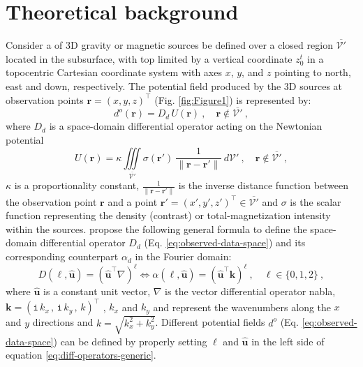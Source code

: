 \section{Theoretical background}

Consider a of 3D gravity or magnetic sources be defined over a closed region 
$\overline{\mathcal{V}'}$ located in the subsurface, with top limited by a vertical 
coordinate $z^{t}_{0}$ in a topocentric Cartesian coordinate system with axes 
$x$, $y$, and $z$ pointing to north, east and down, respectively.
The potential field produced by the 3D sources at observation points 
$\mathbf{r} = (x, y, z)^{\top}$ (Fig.  \ref{fig:Figure1}) is represented by:
\begin{equation}
	d^{o}(\mathbf{r}) = D_{d} \, U(\mathbf{r}) \: , 
	\quad \mathbf{r} \notin \overline{\mathcal{V}'} \: ,
	\label{eq:observed-data-space}
\end{equation}
where $D_{d}$ is a space-domain differential operator acting on the Newtonian potential
\begin{equation}
	U(\mathbf{r}) = \kappa \iiint\limits_{\overline{\mathcal{V}'}}
	\sigma(\mathbf{r}') \: \frac{1}{\| \mathbf{r} - \mathbf{r}'\|}
	\: d\mathcal{V}' \: , 
	\quad \mathbf{r} \notin \overline{\mathcal{V}'} \: ,
	\label{eq:potential-U-space}
\end{equation}
$\kappa$ is a proportionality constant,
$\tfrac{1}{\| \mathbf{r} - \mathbf{r}' \|}$ is the inverse distance function
between the observation point $\mathbf{r}$ and a point 
$\mathbf{r}' = (x', y', z')^{\top} \in \overline{\mathcal{V}'}$
and $\sigma$ is the scalar function representing 
the density (contrast) or total-magnetization intensity within the sources.
\cite{oliveirajr_etal2026_1} propose the following general formula to define the 
space-domain differential operator $D_{d}$ (Eq. \ref{eq:observed-data-space}) 
and its corresponding counterpart $\alpha_{d}$ in the Fourier domain:
\begin{equation}
	D(\ell, \hat{\mathbf{u}}) = 
	\left( \hat{\mathbf{u}}^{\top} \nabla \right)^{\ell} \Leftrightarrow
	\alpha(\ell, \hat{\mathbf{u}}) = \left( \hat{\mathbf{u}}^{\top} \mathbf{k} \right)^{\ell} \: ,
	\quad \ell \in \{ 0, 1, 2 \} \: ,
	\label{eq:diff-operators-generic}
\end{equation}
where $\hat{\mathbf{u}}$ is a constant unit vector,
$\nabla$ is the vector differential operator nabla, 
$\mathbf{k} = ( \mathtt{i} \, k_{x} \, , \, \mathtt{i} \, k_{y} \, , \, k)^{\top}$
\cite{pedersen1978}, $k_{x}$ and $k_{y}$ and represent the wavenumbers along the $x$ and $y$
directions and $k = \sqrt{k_{x}^{2} + k_{y}^{2}}$.
Different potential fields $d^{o}$ (Eq. \ref{eq:observed-data-space}) can be 
defined by properly setting $\ell$ and $\hat{\mathbf{u}}$ in the left side of equation
\ref{eq:diff-operators-generic}. 

